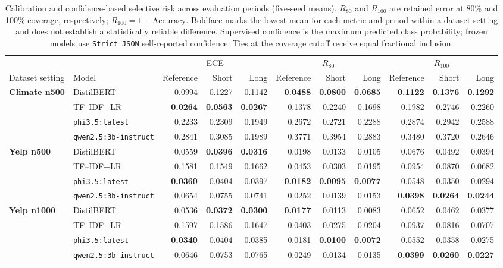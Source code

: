 \begin{table}[t]
\centering\footnotesize
\caption{Calibration and confidence-based selective risk across evaluation periods (five-seed means). $R_{80}$ and $R_{100}$ are retained error at 80\% and 100\% coverage, respectively; $R_{100}=1-\mathrm{Accuracy}$. Boldface marks the lowest mean for each metric and period within a dataset setting and does not establish a statistically reliable difference. Supervised confidence is the maximum predicted class probability; frozen models use \texttt{Strict JSON} self-reported confidence. Ties at the coverage cutoff receive equal fractional inclusion.}
\label{tab:temporal-reliability}
\setlength{\tabcolsep}{3.2pt}
\begin{tabular}{llrrrrrrrrr}
\toprule
& & \multicolumn{3}{c}{ECE} & \multicolumn{3}{c}{$R_{80}$} & \multicolumn{3}{c}{$R_{100}$} \\
\cmidrule(lr){3-5}\cmidrule(lr){6-8}\cmidrule(lr){9-11}
Dataset setting & Model & Reference & Short & Long & Reference & Short & Long & Reference & Short & Long \\
\midrule
\textbf{Climate n500} & DistilBERT & 0.0994 & 0.1227 & 0.1142 & \textbf{0.0488} & \textbf{0.0800} & \textbf{0.0685} & \textbf{0.1122} & \textbf{0.1376} & \textbf{0.1292} \\
 & TF--IDF+LR & \textbf{0.0264} & \textbf{0.0563} & \textbf{0.0267} & 0.1378 & 0.2240 & 0.1698 & 0.1982 & 0.2746 & 0.2260 \\
 & \texttt{phi3.5:latest} & 0.2233 & 0.2309 & 0.1949 & 0.2672 & 0.2721 & 0.2288 & 0.2874 & 0.2942 & 0.2588 \\
 & \texttt{qwen2.5:3b-instruct} & 0.2841 & 0.3085 & 0.1989 & 0.3771 & 0.3954 & 0.2883 & 0.3480 & 0.3720 & 0.2646 \\
\midrule
\textbf{Yelp n500} & DistilBERT & 0.0559 & \textbf{0.0396} & \textbf{0.0316} & 0.0198 & 0.0133 & 0.0105 & 0.0676 & 0.0492 & 0.0394 \\
 & TF--IDF+LR & 0.1581 & 0.1549 & 0.1662 & 0.0453 & 0.0303 & 0.0195 & 0.0954 & 0.0870 & 0.0682 \\
 & \texttt{phi3.5:latest} & \textbf{0.0360} & 0.0404 & 0.0397 & \textbf{0.0182} & \textbf{0.0095} & \textbf{0.0077} & 0.0548 & 0.0350 & 0.0294 \\
 & \texttt{qwen2.5:3b-instruct} & 0.0654 & 0.0755 & 0.0741 & 0.0252 & 0.0139 & 0.0153 & \textbf{0.0398} & \textbf{0.0264} & \textbf{0.0244} \\
\midrule
\textbf{Yelp n1000} & DistilBERT & 0.0536 & \textbf{0.0372} & \textbf{0.0300} & \textbf{0.0177} & 0.0113 & 0.0083 & 0.0652 & 0.0462 & 0.0377 \\
 & TF--IDF+LR & 0.1597 & 0.1586 & 0.1647 & 0.0403 & 0.0275 & 0.0204 & 0.0937 & 0.0816 & 0.0707 \\
 & \texttt{phi3.5:latest} & \textbf{0.0340} & 0.0404 & 0.0385 & 0.0181 & \textbf{0.0100} & \textbf{0.0072} & 0.0552 & 0.0358 & 0.0275 \\
 & \texttt{qwen2.5:3b-instruct} & 0.0646 & 0.0753 & 0.0765 & 0.0249 & 0.0134 & 0.0135 & \textbf{0.0399} & \textbf{0.0260} & \textbf{0.0227} \\
\bottomrule
\end{tabular}
\end{table}
